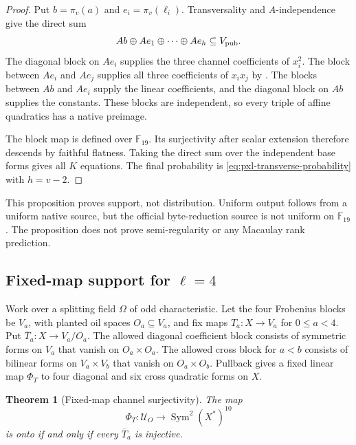 \documentclass[11pt]{article}
\newtheorem{theorem}{Theorem}[section]
\newcommand{\F}{\mathbb F}
\newcommand{\Sym}{\operatorname{Sym}}
\begin{document}
\begin{proof}
Put $b=\pi_v(a)$ and $e_i=\pi_v(\ell_i)$.  Transversality and
$A$-independence give the direct sum
\[
 Ab\oplus Ae_1\oplus\cdots\oplus Ae_h\subseteq V_{\rm pub}.
\]
The diagonal block on $Ae_i$ supplies the three channel coefficients of
$x_i^2$.  The block between $Ae_i$ and $Ae_j$ supplies all three
coefficients of $x_ix_j$ by .  The blocks
between $Ab$ and $Ae_i$ supply the linear coefficients, and the diagonal
block on $Ab$ supplies the constants.  These blocks are independent, so
every triple of affine quadratics has a native preimage.

The block map is defined over $\F_{19}$.  Its surjectivity after scalar
extension therefore descends by faithful flatness.  Taking the direct sum
over the independent base forms gives all $K$ equations.  The final
probability is \eqref{eq:pxl-transverse-probability} with $h=v-2$.
\end{proof}

This proposition proves support, not distribution.  Uniform output follows
from a uniform native source, but the official byte-reduction source is not
uniform on $\F_{19}$.  The proposition does not prove semi-regularity or any
Macaulay rank prediction.

\subsection{Fixed-map support for \texorpdfstring{$\ell=4$}{ell=4}}
\label{sec:pxl-l4-support}

Work over a splitting field $\Omega$ of odd characteristic.  Let the four
Frobenius blocks be $V_a$, with planted oil spaces $O_a\subseteq V_a$, and
fix maps $T_a:X\to V_a$ for $0\le a<4$.  Put
$\overline T_a:X\to V_a/O_a$.  The allowed diagonal coefficient block
consists of symmetric forms on $V_a$ that vanish on $O_a\times O_a$.  The
allowed cross block for $a<b$ consists of bilinear forms on
$V_a\times V_b$ that vanish on $O_a\times O_b$.  Pullback gives a fixed
linear map $\Phi_T$ to four diagonal and six cross quadratic forms on $X$.

\begin{theorem}[Fixed-map channel surjectivity]
\label{thm:pxl-fixed-map-surjectivity}
The map
\[
 \Phi_T:\mathcal U_O\longrightarrow\Sym^2(X^*)^{10}
\]
is onto if and only if every $\overline T_a$ is injective.
\end{theorem}
\end{document}
